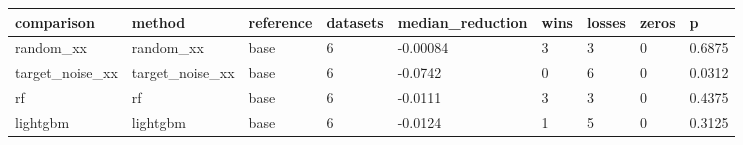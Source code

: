 \begin{tabular}{lllllllll}
\toprule
comparison & method & reference & datasets & median\_reduction & wins & losses & zeros & p \\
\midrule
random\_xx & random\_xx & base & 6 & -0.00084 & 3 & 3 & 0 & 0.6875 \\
target\_noise\_xx & target\_noise\_xx & base & 6 & -0.0742 & 0 & 6 & 0 & 0.0312 \\
rf & rf & base & 6 & -0.0111 & 3 & 3 & 0 & 0.4375 \\
lightgbm & lightgbm & base & 6 & -0.0124 & 1 & 5 & 0 & 0.3125 \\
\bottomrule
\end{tabular}
